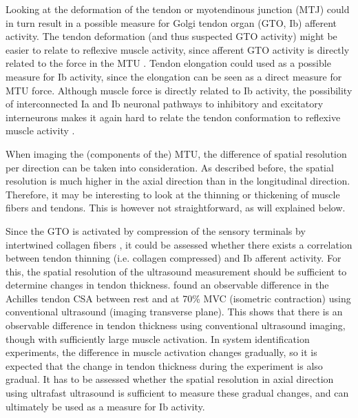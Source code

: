 Looking at the deformation of the tendon or myotendinous junction (MTJ) could in turn result in a possible measure for Golgi tendon organ (GTO, Ib) afferent activity. The tendon deformation (and thus suspected GTO activity) might be easier to relate to reflexive muscle activity, since afferent GTO activity is directly related to the force in the MTU \cite{crago_sampling_1982}. Tendon elongation could used as a possible measure for Ib activity, since the elongation can be seen as a direct measure for MTU force. Although muscle force is directly related to Ib activity, the possibility of interconnected Ia and Ib neuronal pathways to inhibitory and excitatory interneurons makes it again hard to relate the tendon conformation to reflexive muscle activity \cite{jankowska_shared_1983}. 

When imaging the (components of the) MTU, the difference of spatial resolution per direction can be taken into consideration. As described before, the spatial resolution is much higher in the axial direction than in the longitudinal direction. Therefore, it may be interesting to look at the thinning or thickening of muscle fibers and tendons. This is however not straightforward, as will explained below. 

Since the GTO is activated by compression of the sensory terminals by intertwined collagen fibers \cite{jami_golgi_1992}, it could be assessed whether there exists a correlation between tendon thinning (i.e. collagen compressed) and Ib afferent activity. For this, the spatial resolution of the ultrasound measurement should be sufficient to determine changes in tendon thickness. \citet{obst_three-dimensional_2014} found an observable difference in the Achilles tendon CSA between rest and at 70\% MVC (isometric contraction) using conventional ultrasound (imaging transverse plane). This shows that there is an observable difference in tendon thickness using conventional ultrasound imaging, though with sufficiently large muscle activation. In system identification experiments, the difference in muscle activation changes gradually, so it is expected that the change in tendon thickness during the experiment is also gradual. It has to be assessed whether the spatial resolution in axial direction using ultrafast ultrasound is sufficient to measure these gradual changes, and can ultimately be used as a measure for Ib activity.

